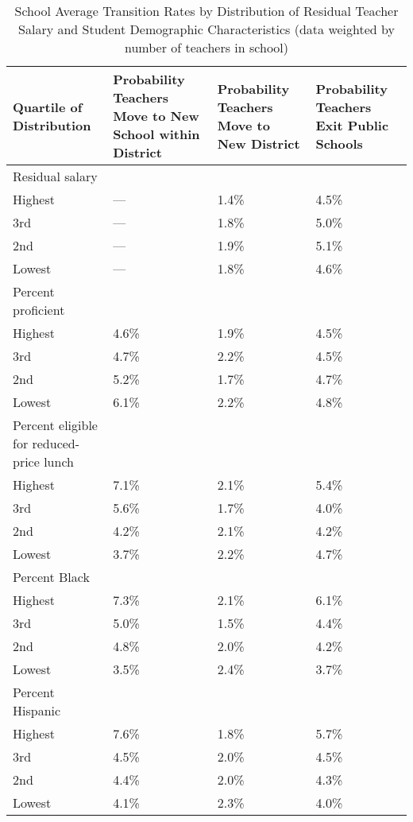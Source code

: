 \documentclass[12pt,]{article}
\begin{document}
\begin{table}[htbp]
\centering
\begin{tabular}{p{}p{}p{}p{}}
  \hline
Quartile of Distribution & Probability Teachers Move to New School within District & Probability Teachers Move to New District & Probability Teachers Exit Public Schools \\ 
  \hline
Residual salary & & & \\
\quad Highest & --- & 1.4\% & 4.5\% \\ 
  \quad 3rd & --- & 1.8\% & 5.0\% \\ 
  \quad 2nd & --- & 1.9\% & 5.1\% \\ 
  \quad Lowest & --- & 1.8\% & 4.6\% \\ 
Percent proficient & & & \\
  \quad Highest & 4.6\% & 1.9\% & 4.5\% \\ 
  \quad 3rd & 4.7\% & 2.2\% & 4.5\% \\ 
  \quad 2nd & 5.2\% & 1.7\% & 4.7\% \\ 
  \quad Lowest & 6.1\% & 2.2\% & 4.8\% \\ 
Percent eligible for reduced-price lunch & & & \\
  \quad Highest & 7.1\% & 2.1\% & 5.4\% \\ 
  \quad 3rd & 5.6\% & 1.7\% & 4.0\% \\ 
  \quad 2nd & 4.2\% & 2.1\% & 4.2\% \\ 
  \quad Lowest & 3.7\% & 2.2\% & 4.7\% \\ 
Percent Black & & & \\
  \quad Highest & 7.3\% & 2.1\% & 6.1\% \\ 
  \quad 3rd & 5.0\% & 1.5\% & 4.4\% \\ 
  \quad 2nd & 4.8\% & 2.0\% & 4.2\% \\ 
  \quad Lowest & 3.5\% & 2.4\% & 3.7\% \\ 
Percent Hispanic & & & \\
  \quad Highest & 7.6\% & 1.8\% & 5.7\% \\ 
  \quad 3rd & 4.5\% & 2.0\% & 4.5\% \\ 
  \quad 2nd & 4.4\% & 2.0\% & 4.3\% \\ 
  \quad Lowest & 4.1\% & 2.3\% & 4.0\% \\ 
   \hline
\end{tabular}
\caption{School Average Transition Rates by Distribution of Residual Teacher Salary and Student Demographic Characteristics (data weighted by number of teachers in school)} 
\label{tbl:change_by_quartile}
\end{table}
\end{document}
